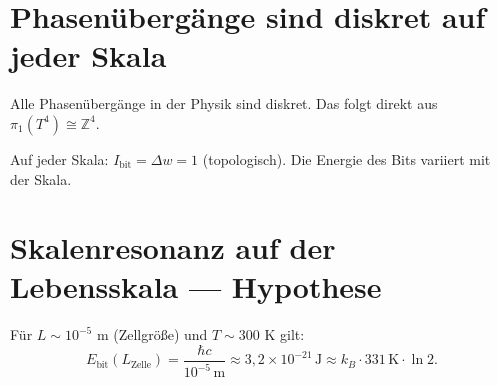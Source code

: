 \section{Phasenübergänge sind diskret auf jeder Skala}

Alle Phasenübergänge in der Physik sind diskret.
Das folgt direkt aus \(\pi_1(T^4) \cong \mathbb{Z}^4\).

\begin{center}
\renewcommand{\arraystretch}{1.4}
\end{center}

Auf jeder Skala: \(I_\text{bit} = \Delta w = 1\) (topologisch).
Die Energie des Bits variiert mit der Skala.

\section{Skalenresonanz auf der Lebensskala — Hypothese}

Für \(L \sim 10^{-5}\) m (Zellgröße) und \(T \sim 300\) K gilt:
\begin{equation}
  E_\text{bit}(L_\text{Zelle}) = \frac{\hbar c}{10^{-5}\,\text{m}}
  \approx 3{,}2 \times 10^{-21}\,\text{J}
  \approx k_B \cdot 331\,\text{K} \cdot \ln 2.
\end{equation}

